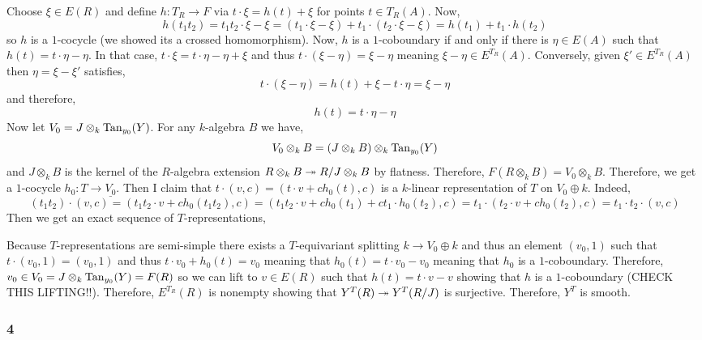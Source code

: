 \documentclass[12pt]{article}
\begin{document}
Choose $\xi \in E(R)$ and define $h : T_R \to F$ via $t \cdot \xi = h(t) + \xi$ for points $t \in T_R(A)$. Now,
\[ h(t_1 t_2) = t_1 t_2 \cdot \xi - \xi = (t_1 \cdot \xi - \xi) + t_1 \cdot (t_2 \cdot \xi - \xi)  = h(t_1) + t_1 \cdot h(t_2) \]
so $h$ is a $1$-cocycle (we showed its a crossed homomorphism). Now, $h$ is a $1$-coboundary if and only if there is $\eta \in E(A)$ such that $h(t) = t \cdot \eta - \eta$. In that case, $t \cdot \xi = t \cdot \eta - \eta + \xi$ and thus $t \cdot (\xi - \eta) = \xi - \eta$ meaning $\xi - \eta \in E^{T_R}(A)$. Conversely, given $\xi' \in E^{T_R}(A)$ then $\eta = \xi - \xi'$ satisfies,
\[ t \cdot (\xi - \eta) = h(t) + \xi - t \cdot \eta = \xi - \eta \]
and therefore,
\[ h(t) = t \cdot \eta - \eta \]
Now let $V_0 = J \otimes_k \mathrm{Tan}_{y_0}(Y)$. For any $k$-algebra $B$ we have,
\[ V_0 \otimes_k B = (J \otimes_k B) \otimes_k \mathrm{Tan}_{y_0}(Y) \]
and $J \otimes_k B$ is the kernel of the $R$-algebra extension $R \otimes_k B \twoheadrightarrow R/J \otimes_k B$ by flatness. Therefore, $F(R \otimes_k B) = V_0 \otimes_k B$. Therefore, we get a $1$-cocycle $h_0 : T \to \underline{V_0}$. Then I claim that $t \cdot (v,c) = (t \cdot v + c h_0(t), c)$ is a $k$-linear representation of $T$ on $V_0 \oplus k$. Indeed,
\[ (t_1 t_2) \cdot (v, c) = (t_1 t_2 \cdot v + c h_0(t_1 t_2), c) = (t_1 t_2 \cdot v + c h_0(t_1) + c t_1 \cdot h_0(t_2), c) = t_1 \cdot (t_2 \cdot v + c h_0(t_2), c) = t_1 \cdot t_2 \cdot (v, c) \]
Then we get an exact sequence of $T$-representations,
\begin{center}
\end{center}
Because $T$-representations are semi-simple there exists a $T$-equivariant splitting $k \to V_0 \oplus k$ and thus an element $(v_0, 1)$ such that $t \cdot (v_0, 1) = (v_0, 1)$ and thus $t \cdot v_0 + h_0(t) = v_0$ meaning that $h_0(t) = t \cdot v_0 - v_0$ meaning that $h_0$ is a $1$-coboundary. Therefore, $v_0 \in V_0 = J \otimes_k \mathrm{Tan}_{y_0}(Y) = F(R)$ so we can lift to $v \in E(R)$ such that $h(t) = t \cdot v - v$  showing that $h$ is a $1$-coboundary (CHECK THIS LIFTING!!). Therefore, $E^{T_R}(R)$ is nonempty showing that $Y^T(R) \twoheadrightarrow Y^T(R/J)$ is surjective. Therefore, $Y^T$ is smooth.
 
\subsubsection{4}
\end{document}
